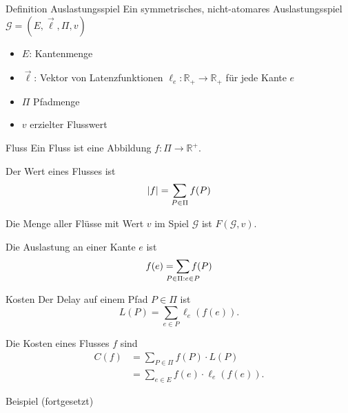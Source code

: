 \documentclass{beamer}
\begin{document}
\begin{frame}{Definition Auslastungsspiel}
	Ein symmetrisches, nicht-atomares \alert{Auslastungsspiel} $\mathcal G = (E, \vec{\ell}, \Pi, v)$
	\begin{itemize}
		\item $E$: Kantenmenge
		\item $\vec{\ell}$: Vektor von Latenzfunktionen $\ell_e : \mathbb R_+ \to \mathbb R_+$ für jede Kante $e$
		\item $\Pi$ Pfadmenge
		\item $v$ erzielter Flusswert
	\end{itemize}
\end{frame}

\begin{frame}{Fluss}
	Ein \alert{Fluss} ist eine Abbildung $f: \Pi \to \mathbb R^+$. 
	
	Der \alert{Wert} eines Flusses ist \[ \abs{f} = \sum_{P \in \Pi} f(P) \]
	
	Die Menge aller Flüsse mit Wert $v$ im Spiel $\mathcal G$ ist $F(\mathcal G, v)$.
	
	Die Auslastung an einer Kante $e$ ist \[ f(e) = \sum_{\mathclap{P \in \Pi: e \in P}} f(P) \]
\end{frame}

\begin{frame}{Kosten}
	Der \alert{Delay} auf einem Pfad $P \in \Pi$ ist
	\[ L(P) = \sum_{e \in P} \ell_e\left(f\left(e\right)\right). \]
	
	Die \alert{Kosten} eines Flusses $f$ sind
	\begin{align*}
		C(f) &= \sum_{P \in \Pi} f(P) \cdot L(P) \\
			&= \sum_{e \in E} f(e) \cdot \ell_e\left(f\left(e\right)\right). 
	\end{align*} 
\end{frame}

\begin{frame}{Beispiel (fortgesetzt)}
\end{frame}
\end{document}
